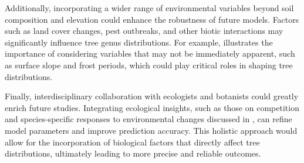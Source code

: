 Additionally, incorporating a wider range of environmental variables beyond soil composition and elevation could enhance the robustness of future models. Factors such as land cover changes, pest outbreaks, and other biotic interactions may significantly influence tree genus distributions. For example, \cite{usda} illustrates the importance of considering variables that may not be immediately apparent, such as surface slope and frost periods, which could play critical roles in shaping tree distributions.

Finally, interdisciplinary collaboration with ecologists and botanists could greatly enrich future studies. Integrating ecological insights, such as those on competition and species-specific responses to environmental changes discussed in \cite{Magalhães2021}, can refine model parameters and improve prediction accuracy. This holistic approach would allow for the incorporation of biological factors that directly affect tree distributions, ultimately leading to more precise and reliable outcomes.